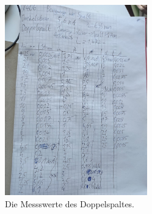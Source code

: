     \begin{figure}[h]
        \centering
        \includegraphics[width=0.55\textwidth]{latex/images/messdop.jpeg}
        \caption{Die Messswerte des Doppelspaltes.}
        \label{img:mess1}
    \end{figure}
  